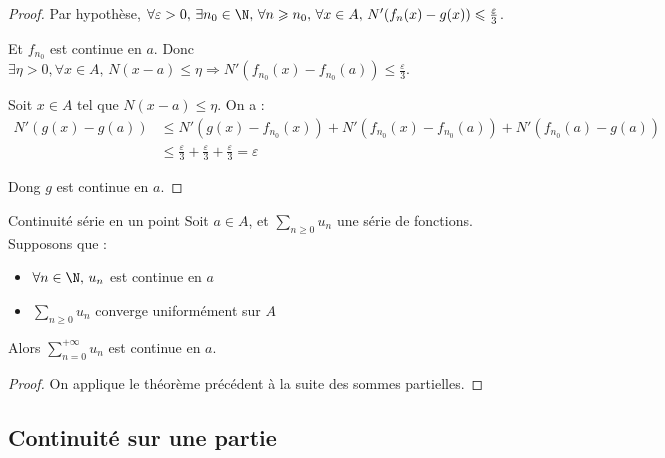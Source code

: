 \begin{proof}
    Par hypothèse, $\forall \varepsilon > 0, \, \exists n_0 \in \N, \, \forall n \geqslant n_0, \, \forall x \in A, \, N'(f_n(x) - g(x)) \leqslant \frac \varepsilon 3$.

    Et $f_{n_0}$ est continue en $a$. Donc $\exists \eta > 0, \forall x \in A, \, N(x - a) \leqslant \eta \Rightarrow N'(f_{n_0}(x) - f_{n_0}(a)) \leqslant \frac \varepsilon 3$.

    Soit $x \in A$ tel que $N(x - a) \leqslant \eta$. On a :
    \begin{align}
        N'(g(x) - g(a)) & \leqslant N'(g(x) - f_{n_0}(x)) + N'(f_{n_0}(x) - f_{n_0}(a)) + N'(f_{n_0}(a) - g(a)) \\
        & \leqslant \frac \varepsilon 3 + \frac \varepsilon 3 + \frac \varepsilon 3 = \varepsilon
    \end{align}

    Dong $g$ est continue en $a$.
\end{proof}

\begin{theoreme}{Continuité série en un point}{}
    Soit $a \in A$, et $\displaystyle \sum_{n \geqslant 0} u_n$ une série de fonctions. Supposons que : 
    \begin{itemize}
        \item $\forall n \in \N, \, u_n$ est continue en $a$
        \item $\displaystyle \sum_{n \geqslant 0} u_n$ converge uniformément sur $A$ 
    \end{itemize}
    Alors $\displaystyle \sum_{n = 0}^{+ \infty} u_n$ est continue en $a$.
\end{theoreme}

\begin{proof}
    On applique le théorème précédent à la suite des sommes partielles.
\end{proof}

\subsection{Continuité sur une partie}

